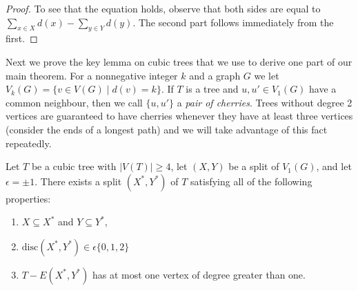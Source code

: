 \documentclass[12pt]{article}
\begin{document}
\begin{proof}
To see that the equation holds, observe that both sides are equal to $\sum_{x \in X} d(x) - \sum_{y \in Y} d(y)$.  The second part follows immediately from the first.
\end{proof}



Next we prove the key lemma on cubic trees that we use to derive one part of our main theorem.  For a nonnegative integer $k$ and a graph $G$ we let $V_k(G) = \{ v \in V(G) \mid d(v) = k \}$.  If $T$ is a tree and $u,u' \in V_1(G)$ have a common neighbour, then we call $\{u,u'\}$ a \emph{pair of cherries}.  Trees without degree 2 vertices are guaranteed to have cherries whenever they have at least three vertices (consider the ends of a longest path) and we will take advantage of this fact repeatedly.

\begin{lemma}
\label{unrootedlemma}
Let $T$ be a cubic tree with $|V(T)| \ge 4$, let $(X,Y)$ be a split of $V_1(G)$, and let $\epsilon = \pm 1$.  There exists a split $(X^*,Y^*)$ of $T$ satisfying all of the following properties:
\begin{enumerate}
\item $X \subseteq X^*$ and $Y \subseteq Y^*$,
\item $\mathrm{disc}(X^*,Y^*) \in \epsilon \{0,1,2\}$
\item $T - E(X^*,Y^*)$ has at most one vertex of degree greater than one.
\end{enumerate}
\end{lemma}
\end{document}
